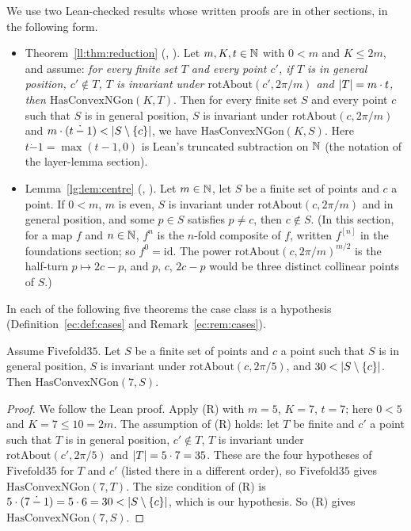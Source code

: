 We use two Lean-checked results whose written proofs are in other sections, in the following form.
\begin{itemize}
\item[(R)] Theorem~\ref{ll:thm:reduction} (, ). Let
  $m,K,t\in\mathbb N$ with $0<m$ and $K\le2m$, and assume: \emph{for every finite set $T$ and every point $c'$, if $T$ is in
  general position, $c'\notin T$, $T$ is invariant under $\mathrm{rotAbout}(c',2\pi/m)$ and $\lvert T\rvert=m\cdot t$, then
  $\mathrm{HasConvexNGon}(K,T)$}. Then for every finite set $S$ and every point $c$ such that $S$ is in general
  position, $S$ is invariant under $\mathrm{rotAbout}(c,2\pi/m)$ and $m\cdot(t\mathbin{\dot{-}}1)<\lvert S\setminus\{c\}\rvert$,
  we have $\mathrm{HasConvexNGon}(K,S)$. Here $t\mathbin{\dot{-}}1=\max(t-1,0)$ is Lean's truncated subtraction
  on $\mathbb N$ (the notation of the layer-lemma section).
\item[(C)] Lemma~\ref{lg:lem:centre} (, ). Let
  $m\in\mathbb N$, let $S$ be a finite set of points and $c$ a point. If $0<m$, $m$ is even, $S$ is invariant under
  $\mathrm{rotAbout}(c,2\pi/m)$ and in general position, and some $p\in S$ satisfies $p\ne c$, then $c\notin S$. (In
  this section, for a map $f$ and $n\in\mathbb N$, $f^n$ is the $n$-fold composite of $f$, written $f^{[n]}$ in the
  foundations section; so $f^0=\mathrm{id}$. The power $\mathrm{rotAbout}(c,2\pi/m)^{m/2}$ is the half-turn
  $p\mapsto 2c-p$, and $p$, $c$, $2c-p$ would be three distinct collinear points of $S$.)
\end{itemize}

In each of the following five theorems the case class is a hypothesis (Definition~\ref{ec:def:cases} and
Remark~\ref{ec:rem:cases}).

\begin{theorem}\label{ec:thm:fivefold-erase}
Assume $\mathrm{Fivefold35}$. Let $S$ be a finite set of points and $c$ a point such that $S$ is in general position,
$S$ is invariant under $\mathrm{rotAbout}(c,2\pi/5)$, and $30<\lvert S\setminus\{c\}\rvert$. Then
$\mathrm{HasConvexNGon}(7,S)$.
\end{theorem}

\begin{proof}
We follow the Lean proof. Apply (R) with $m=5$, $K=7$, $t=7$; here $0<5$ and $K=7\le10=2m$. The assumption of (R)
holds: let $T$ be finite and $c'$ a point such that $T$ is in general position, $c'\notin T$, $T$ is invariant under
$\mathrm{rotAbout}(c',2\pi/5)$ and $\lvert T\rvert=5\cdot7=35$. These are the four hypotheses of $\mathrm{Fivefold35}$ for
$T$ and $c'$ (listed there in a different order), so $\mathrm{Fivefold35}$ gives $\mathrm{HasConvexNGon}(7,T)$. The
size condition of (R) is $5\cdot(7\mathbin{\dot{-}}1)=5\cdot6=30<\lvert S\setminus\{c\}\rvert$, which is our hypothesis. So (R) gives
$\mathrm{HasConvexNGon}(7,S)$.
\end{proof}

